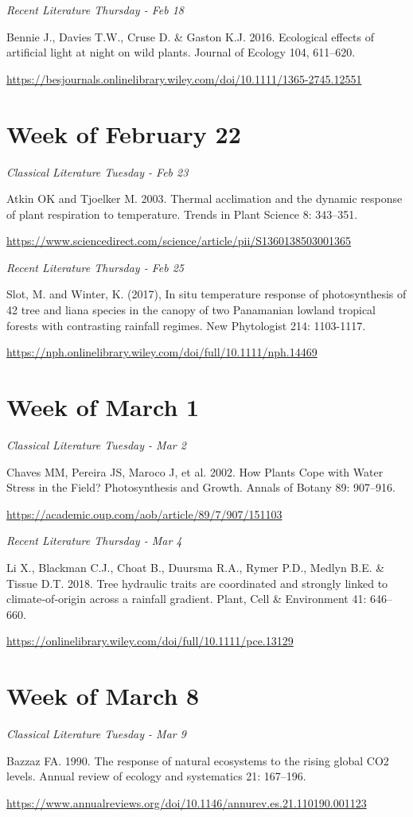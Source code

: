\documentclass[12pt, notitlepage]{article}   	%
\begin{document}
{\textit{Recent Literature Thursday - Feb 18} \par
Bennie J., Davies T.W., Cruse D. & Gaston K.J. 2016. 
Ecological effects of artificial light at night on wild plants. 
Journal of Ecology 104, 611–620. \par
\url{https://besjournals.onlinelibrary.wiley.com/doi/10.1111/1365-2745.12551}

\section*{Week of February 22}
\textit{Classical Literature Tuesday - Feb 23} \par
Atkin OK and Tjoelker M. 2003. Thermal acclimation and the dynamic response of plant 
respiration to temperature. Trends in Plant Science 8: 343–351. \par
\url{https://www.sciencedirect.com/science/article/pii/S1360138503001365}

\textit{Recent Literature Thursday - Feb 25} \par
Slot, M. and Winter, K. (2017), In situ temperature response of photosynthesis of 42 tree 
and liana species in the canopy of two Panamanian lowland tropical forests with 
contrasting rainfall regimes. New Phytologist 214: 1103-1117. \par
\url{https://nph.onlinelibrary.wiley.com/doi/full/10.1111/nph.14469}

\section*{Week of March 1}
\textit{Classical Literature Tuesday - Mar 2} \par
Chaves MM, Pereira JS, Maroco J, et al. 2002. How Plants Cope with Water Stress 
in the Field? Photosynthesis and Growth. Annals of Botany 89: 907–916. \par
\url{https://academic.oup.com/aob/article/89/7/907/151103}

\textit{Recent Literature Thursday - Mar 4} \par
Li X., Blackman C.J., Choat B., Duursma R.A., Rymer P.D., Medlyn B.E. & Tissue D.T. 2018.
Tree hydraulic traits are coordinated and strongly linked to climate‐of‐origin across a rainfall gradient.
Plant, Cell & Environment 41: 646–660. \par
\url{https://onlinelibrary.wiley.com/doi/full/10.1111/pce.13129}

\section*{Week of March 8}
\textit{Classical Literature Tuesday - Mar 9} \par
Bazzaz FA. 1990. The response of natural ecosystems to the rising global CO2 levels. 
Annual review of ecology and systematics 21: 167–196. \par
\url{https://www.annualreviews.org/doi/10.1146/annurev.es.21.110190.001123}

}
\end{document}
